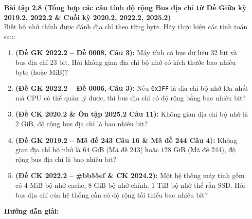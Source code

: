 \textbf{Bài tập 2.8 (Tổng hợp các câu tính độ rộng Bus địa chỉ từ Đề Giữa kỳ 2019.2, 2022.2 \& Cuối kỳ 2020.2, 2022.2, 2025.2)}\\
Biết bộ nhớ chính được đánh địa chỉ theo từng byte. Hãy thực hiện các tính toán sau:
\begin{enumerate}[label=\alph*)]
    \item \textbf{(Đề GK 2022.2 -- Đề 0008, Câu 3):} Máy tính có bus dữ liệu $32\text{ bit}$ và bus địa chỉ $23\text{ bit}$. Hỏi không gian địa chỉ bộ nhớ có kích thước bao nhiêu byte (hoặc MiB)?
    \item \textbf{(Đề GK 2022.2 -- Đề 0006, Câu 3):} Nếu \texttt{0x3FF} là địa chỉ bộ nhớ lớn nhất mà CPU có thể quản lý được, thì bus địa chỉ có độ rộng bằng bao nhiêu bit?
    \item \textbf{(Đề CK 2020.2 \& Ôn tập 2025.2 Câu 11):} Không gian địa chỉ bộ nhớ là $2\text{ GiB}$, độ rộng bus địa chỉ là bao nhiêu bit?
    \item \textbf{(Đề GK 2019.2 -- Mã đề 243 Câu 16 \& Mã đề 244 Câu 4):} Không gian địa chỉ bộ nhớ là $64\text{ GiB}$ (Mã đề 243) hoặc $128\text{ GiB}$ (Mã đề 244), độ rộng bus địa chỉ là bao nhiêu bit?
    \item \textbf{(Đề CK 2022.2 -- \#bb55ef \& CK 2024.2):} Một hệ thống máy tính gồm có $4\text{ MiB}$ bộ nhớ cache, $8\text{ GiB}$ bộ nhớ chính, $1\text{ TiB}$ bộ nhớ thể rắn SSD. Hỏi bus địa chỉ của hệ thống cần có độ rộng tối thiểu bao nhiêu bit?
\end{enumerate}
\textbf{Hướng dẫn giải:}
